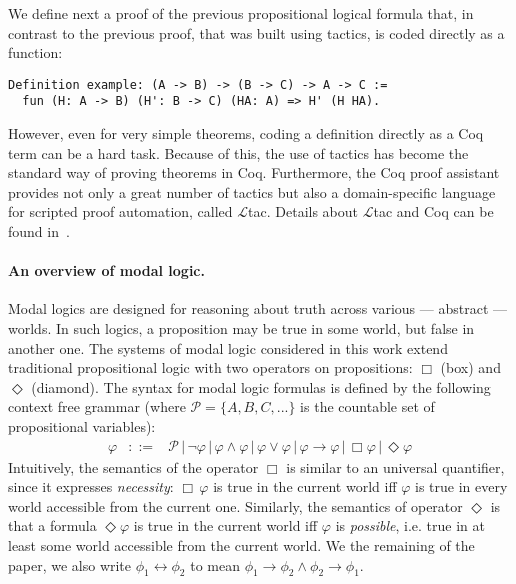 \documentclass[sigconf]{acmart}
\begin{document}
We define next a proof of the previous propositional logical formula
that, in contrast to the previous proof, that was built using tactics, is coded
directly as a function:
\begin{verbatim}
Definition example: (A -> B) -> (B -> C) -> A -> C :=
  fun (H: A -> B) (H': B -> C) (HA: A) => H' (H HA).
\end{verbatim}
However, even for very simple theorems, coding a definition directly
as a Coq term can be a hard task. Because of this, the use of tactics
has become the standard way of proving theorems in Coq. Furthermore,
the Coq proof assistant provides not only a great number of tactics
but also a domain-specific language for scripted proof automation,
called $\mathcal{L}$tac. Details about $\mathcal{L}$tac and Coq can be found
in~\cite{Chlipala13,Bertot10,manual_coq}.

\paragraph{An overview of modal logic.} Modal logics are designed for reasoning
about truth across various --- abstract --- worlds. In such logics, a
proposition may be true in some world, but false in another one. The systems of
modal logic considered in this work extend traditional propositional logic
with two operators on propositions: $\Box$ (box) and $\Diamond$ (diamond).
The syntax for modal logic formulas is defined by the following context free
grammar (where
$\mathcal{P} = \{A,B,C,...\}$ is the countable set of propositional variables):
\[
  \begin{array}{lcl}
    \varphi & ::= & \mathcal{P}\,|\,\neg\varphi\,|\,\varphi\land\varphi\,|\,\varphi\lor\varphi\,|\,\varphi\to\varphi\,|\,\Box\varphi\,|\,\Diamond\varphi
  \end{array}  
\]
Intuitively, the semantics of the operator $\Box$ is similar to an universal
quantifier, since it expresses \emph{necessity}: $\Box\,\varphi$ is true in the
current world iff $\varphi$ is true in every world accessible from the current
one. Similarly, the semantics of operator
$\Diamond$ is that a formula $\Diamond\varphi$ is true in the current
world iff $\varphi$ is \emph{possible}, i.e. true in at least some world
accessible from the current world. We the remaining of the paper, we also write
$\phi_1\leftrightarrow\phi_2$ to mean $\phi_1\to\phi_2\land\phi_2\to\phi_1$.
\end{document}
